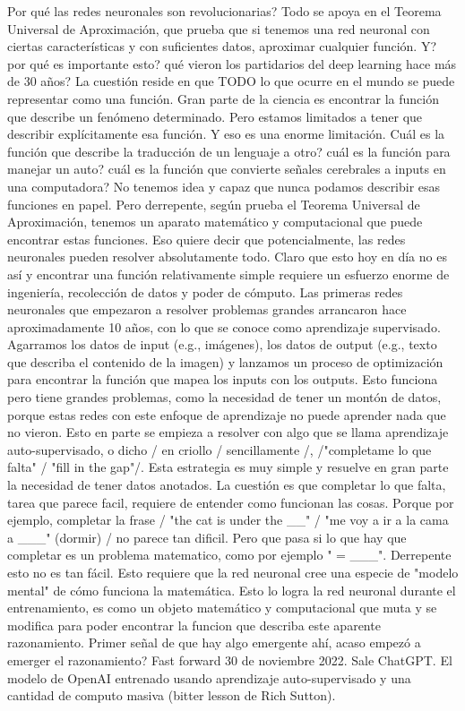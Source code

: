 Por qué las redes neuronales son revolucionarias?
Todo se apoya en el Teorema Universal de Aproximación, que prueba que si 
tenemos una red neuronal con ciertas características y con suficientes datos, 
aproximar cualquier función. Y? por qué es importante esto? qué vieron los partidarios del 
deep learning hace más de 30 años? La cuestión reside en que TODO lo que ocurre en el mundo
se puede representar como una función. Gran parte de la ciencia es encontrar la función que describe un
fenómeno determinado. Pero estamos limitados a tener que describir explícitamente esa función. 
Y eso es una enorme limitación. Cuál es la función que describe la traducción de un lenguaje a otro?
cuál es la función para manejar un auto? cuál es la función que convierte señales cerebrales a inputs
en una computadora? No tenemos idea y capaz que nunca podamos describir esas funciones en papel. 
Pero derrepente, según prueba el Teorema Universal de Aproximación, tenemos un aparato matemático y
computacional que puede encontrar estas funciones. Eso quiere decir que potencialmente, las redes 
neuronales pueden resolver absolutamente todo. Claro que esto hoy en día no es así y encontrar una 
función relativamente simple requiere un esfuerzo enorme de ingeniería, recolección de datos y poder 
de cómputo. Las primeras redes neuronales que empezaron a resolver problemas grandes arrancaron hace
aproximadamente 10 años, con lo que se conoce como aprendizaje supervisado. Agarramos los datos de
input (e.g., imágenes), los datos de output (e.g., texto que describa el contenido de la imagen) y 
lanzamos un proceso de optimización para encontrar la función que mapea los inputs con los outputs. 
Esto funciona pero tiene grandes problemas, como la necesidad de tener un montón de datos, porque estas redes
con este enfoque de aprendizaje no puede aprender nada que no vieron. 
Esto en parte se empieza a resolver con algo que se llama aprendizaje auto-supervisado, o dicho / en criollo / sencillamente /, 
/"completame lo que falta" / "fill in the gap"/. Esta estrategia es muy simple y resuelve en gran parte la necesidad de tener datos
anotados. La cuestión es que completar lo que falta, tarea que parece facil, requiere de entender como funcionan las cosas. 
Porque por ejemplo, completar la frase / "the cat is under the __" / "me voy a ir a la cama a ___" (dormir) / no parece tan dificil. 
Pero que pasa si lo que hay que completar es un problema matematico, como por ejemplo " = ___". Derrepente esto 
no es tan fácil. Esto requiere que la red neuronal cree una especie de "modelo mental" de cómo funciona la matemática. 
Esto lo logra la red neuronal durante el entrenamiento, es como un objeto matemático y computacional que muta y se modifica para poder
encontrar la funcion que describa este aparente razonamiento. Primer señal de que hay algo emergente ahí, acaso empezó a emerger el razonamiento?
Fast forward 30 de noviembre 2022. Sale ChatGPT. El modelo de OpenAI entrenado usando aprendizaje auto-supervisado y una cantidad de 
computo masiva (bitter lesson de Rich Sutton). 

